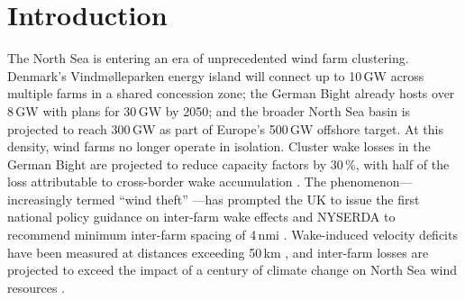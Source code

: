 \documentclass[wes, manuscript]{copernicus}
\begin{document}
\begin{abstract}
Under Bastankhah, capping realistic-scenario regret at $0.2\%$ of AEP requires at most $\sim$$8$--$9D$ ($\sim$2\,km) for typical North Sea sites---an upper bound, since two conservative post-processing choices each inflate it and removing both gives $\sim$$4$--$6D$.
Under TurboPark---which recovers wakes more slowly and pushes realistic regret an order of magnitude higher---the equivalent $2\%$ threshold is never reached anywhere within the swept range at any of those sites, so the requirement there is censored at $>40D$ ($>9.6$\,km), already beyond common spacing recommendations.
Finally, ringing the target with up to eight neighboring farms shows that regret is non-monotonic in the number of neighbors: it decomposes into AEP loss times the fraction a redesign can recover, and adding farms raises the first while lowering the second.
Lease geometry caps the problem---farms $\sim$$150D$ across admit at most four close neighbors, so the many-close-neighbors case is unbuildable rather than unstudied---and a controlled experiment holding neighbor capacity fixed shows that what closes off redesign is concentrated wake mass in the energy-carrying directions rather than angular symmetry.
The 12--22$\times$ wake-model bracket dominates any single number a policy rule could quote; rather than picking one, we tabulate both and recommend buffer policies treat the bracket explicitly.
\end{abstract}


\section{Introduction}

The North Sea is entering an era of unprecedented wind farm clustering.
Denmark's Vindm\o{}lleparken energy island will connect up to 10\,GW across multiple farms in a shared concession zone; the German Bight already hosts over 8\,GW with plans for 30\,GW by 2050; and the broader North Sea basin is projected to reach 300\,GW as part of Europe's 500\,GW offshore target.
At this density, wind farms no longer operate in isolation.
Cluster wake losses in the German Bight are projected to reduce capacity factors by 30\,\%, with half of the loss attributable to cross-border wake accumulation \citep{Fliegner2025}.
The phenomenon---increasingly termed ``wind theft'' \citep{Finseraas2024, Du2026}---has prompted the UK to issue the first national policy guidance on inter-farm wake effects and NYSERDA to recommend minimum inter-farm spacing of 4\,nmi \citep{NYSERDA2018}.
Wake-induced velocity deficits have been measured at distances exceeding 50\,km \citep{Schneemann2020, Canadillas2022}, and inter-farm losses are projected to exceed the impact of a century of climate change on North Sea wind resources \citep{Warder2025}.
\end{document}
